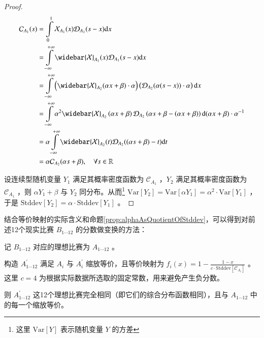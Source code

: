         \begin{proof}
            \begin{align*}
                \mathcal{C}_{A_1}(s)
                &=\int\limits_0^1 \mathcal{X}_{A_1}(x)\mathcal{D}_{A_1}(s-x) \mathrm{d}x \\
                &=\int\limits_{-\infty}^{+\infty} \widebar{\mathcal{X}}_{A_1}(x)\mathcal{D}_{A_1}(s-x) \mathrm{d}x \\
                &=\int\limits_{-\infty}^{+\infty} \left(\widebar{\mathcal{X}}_{A_2}(\alpha x+\beta)\cdot\alpha\right)\left(\mathcal{D}_{A_2}(\alpha(s-x))\cdot\alpha\right) \mathrm{d}x\\
                &=\int\limits_{-\infty}^{+\infty} \alpha^2\widebar{\mathcal{X}}_{A_2}\left(\alpha x+\beta\right)\mathcal{D}_{A_2}\left(\alpha s+\beta-\left(\alpha x+\beta\right)\right) \mathrm{d}(\alpha x+\beta)\cdot\alpha^{-1}\\
                &=\alpha\int\limits_{-\infty}^{+\infty} \widebar{\mathcal{X}}_{A_2}(t)\mathcal{D}_{A_2}((\alpha s+\beta)-t)\mathrm{d} t\\
                &=\alpha\mathcal{C}_{A_2}(\alpha s+\beta),\quad\forall s\in\mathbb{R}
            \end{align*}

            设连续型随机变量 $Y_1$ 满足其概率密度函数为 $\mathcal{C}_{A_1}$ ，$Y_2$ 满足其概率密度函数为 $\mathcal{C}_{A_1}$ ，则 $\alpha Y_1+\beta$ 与 $Y_2$ 同分布。从而\footnote{这里 $\mathrm{Var}\left[Y\right]$ 表示随机变量 $Y$ 的方差} $\mathrm{Var}\left[Y_2\right]=\mathrm{Var}\left[\alpha Y_1\right]=\alpha^2\cdot\mathrm{Var}\left[Y_1\right]$ ，于是 $\mathrm{Stddev}\left[Y_2\right]=\alpha\cdot\mathrm{Stddev}\left[Y_1\right]$ 。
        \end{proof}

        结合等价映射的实际含义和命题\ref{prop:alphaAsQuotientOfStddev}，可以得到对前述12个现实比赛 $B_{1\cdots 12}$ 的分数做变换的方法：
        \begin{asparaenum}[\bfseries{步骤} 1.]
            \item 记 $B_{1\cdots 12}$ 对应的理想比赛为 $A_{1\cdots 12}$ 。
            \item 构造 $A^{\prime}_{1\cdots 12}$ 满足 $A_i$ 与 $A^{\prime}_i$ 缩放等价，且等价映射为 $f_i(x)=1-\frac{1-x}{c\cdot\mathrm{Stddev}\left[\mathcal{C}_{A_i}\right]}$ 。这里 $c=4$ 为根据实际数据所选取的固定常数，用来避免产生负分数。
            \item 则 $A^{\prime}_{1\cdots 12}$ 这12个理想比赛完全相同（即它们的综合分布函数相同），且与 $A_{1\cdots 12}$ 中的每一个缩放等价。
        \end{asparaenum}


